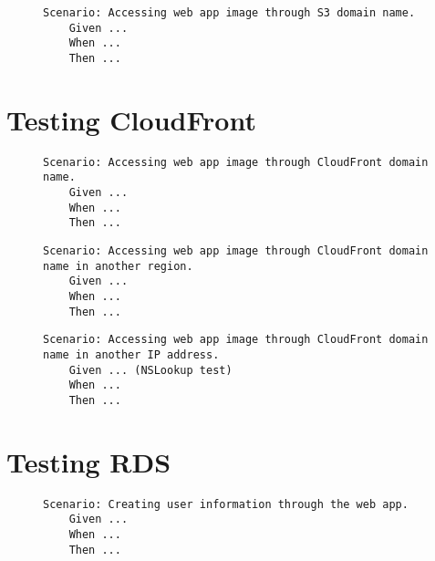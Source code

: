 \begin{figure}[!htbp]
    \centering
    \begin{verbatim}
Scenario: Accessing web app image through S3 domain name.
    Given ...
    When ...
    Then ...
    \end{verbatim}
    \label{fig:accessing-image-s3}
\end{figure}

\section{Testing CloudFront}\label{sec:testing-cloudfront}

\begin{figure}[!htbp]
    \centering
    \begin{verbatim}
Scenario: Accessing web app image through CloudFront domain name.
    Given ...
    When ...
    Then ...
    \end{verbatim}
    \label{fig:accessing-image-cloudfront}
\end{figure}

\begin{figure}[!htbp]
    \centering
    \begin{verbatim}
Scenario: Accessing web app image through CloudFront domain name in another region.
    Given ...
    When ...
    Then ...
    \end{verbatim}
    \label{fig:accessing-image-cloudfront-diff-region}
\end{figure}

\begin{figure}[!htbp]
    \centering
    \begin{verbatim}
Scenario: Accessing web app image through CloudFront domain name in another IP address.
    Given ... (NSLookup test)
    When ...
    Then ...
    \end{verbatim}
    \label{fig:accessing-image-cloudfront-diff-ip}
\end{figure}

\section{Testing RDS}\label{sec:testing-rds}

\begin{figure}[!htbp]
    \centering
    \begin{verbatim}
Scenario: Creating user information through the web app.
    Given ...
    When ...
    Then ...
    \end{verbatim}
    \label{fig:create-user-data}
\end{figure}


